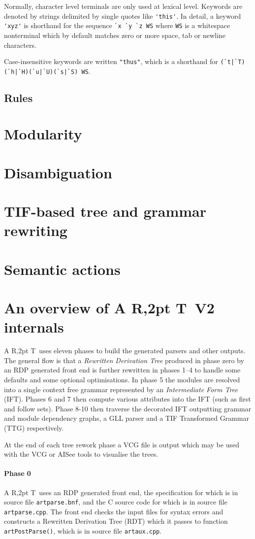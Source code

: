 \documentclass[11pt]{article}
\newcommand{\art}{{\rm A\kern -2pt R\kern -2,2pt T}}
\begin{document}
Normally, character level terminals are only used at lexical
level. Keywords are denoted by strings delimited by single quotes like
\verb+'this'+. In detail, a keyword \verb+'xyz'+ is shorthand for the
sequence \verb+`x `y `z WS+ where \verb+WS+ is a whitespace
nonterminal which by default matches zero or more space, tab or
newline characters.

Case-insensitive keywords are written \verb+"thus"+, which is a shorthand for \verb+(`t|`T)(`h|`H)(`u|`U)(`s|`S) WS+.
\subsection{Rules}
\section{Modularity}
\label{modularity}
\section{Disambiguation}
\label{disambiguation}
\section{TIF-based tree and grammar rewriting}
\label{TIF}
\section{Semantic actions}
\label{semantics}
\appendix
\section{An overview of \art\ V2 internals}
\art\ uses eleven phases to build the generated parsers and other
outputs. The general flow is that a {\em Rewritten Derivation Tree}
produced in phase zero by an RDP generated front end is further rewritten
in phases 1--4 to handle some defaults and some optional
optimisations. In phase 5 the modules are resolved into a single
context free grammar represented by an {\em Intermediate Form Tree}
(IFT). Phases 6 and 7 then compute various attributes into the IFT
(such as first and follow sets). Phase 8-10 then traverse the
decorated IFT outputting grammar and module dependency graphs,
a GLL parser and a TIF Transformed Grammar (TTG) respectively.

At the end of each tree rework phase a VCG file is output which may be
used with the VCG or AISee tools to visualise the trees.

\paragraph{Phase 0}
\art\ uses an RDP generated front end, the specification for which is
in source file {\tt artparse.bnf}, and the C source code for which is
in source file {\tt artparse.cpp}.  The front end checks the input
files for syntax errors and constructs a Rewritten Derivation Tree
(RDT) which it passes to function {\tt artPostParse()}, which is in source file {\tt artaux.cpp}.
\end{document}
